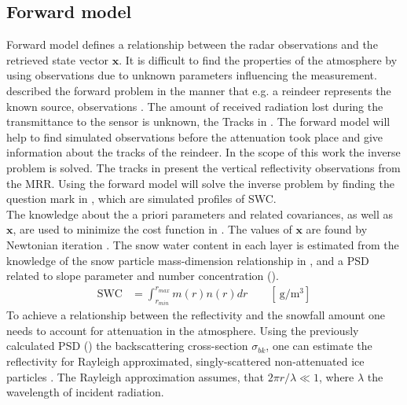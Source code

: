 \subsection{Forward model}\label{sec:forward_model}

Forward model defines a relationship between the radar observations and the retrieved state vector $\mathbf{x}$. It is difficult to find the properties of the atmosphere by using observations due to unknown parameters influencing the measurement. 
\\
\citet{stephens_remote_1994} described the forward problem in the manner that e.g. a reindeer represents the known source, observations . The amount of received radiation lost during the transmittance to the sensor is unknown, the Tracks in . The forward model will help to find simulated observations before the attenuation took place and give information about the tracks of the reindeer. In the scope of this work the inverse problem is solved. The tracks in  present the vertical reflectivity observations from the MRR. Using the forward model will solve the inverse problem by finding the question mark in , which are simulated profiles of SWC.
\\
The knowledge about the a priori parameters and related covariances, as well as $\mathbf{x}$, are used to minimize the cost function in . The values of $\mathbf{x}$ are found by Newtonian iteration \citet[Eq. 5]{wood_estimating_2014}.
\newline
The snow water content in each layer is estimated from the knowledge of the snow particle mass-dimension relationship in , and a PSD related to slope parameter and number concentration (). %
\begin{align}
	\text{SWC} & = \int_{r_{min}}^{r_{max}} m(r) n(r) dr \qquad [\SI{}{\gram\per\cubic\metre}] \label{eq:SWC}
\end{align}
To achieve a relationship between the reflectivity and the snowfall amount one needs to account for attenuation in the atmosphere. Using the previously calculated PSD () the backscattering cross-section $\sigma_{bk}$, one can estimate the reflectivity for Rayleigh approximated, singly-scattered non-attenuated ice particles \citep{lecuyer_estimation-based_2002,kulie_utilizing_2009,wood_microphysical_2015}. The Rayleigh approximation assumes, that $2\pi r/\lambda \ll 1$, where $\lambda$ the wavelength of incident radiation.
